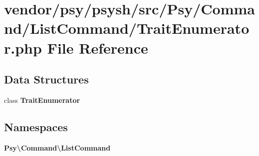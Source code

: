 \section{vendor/psy/psysh/src/\+Psy/\+Command/\+List\+Command/\+Trait\+Enumerator.php File Reference}
\label{_trait_enumerator_8php}
\subsection*{Data Structures}
\begin{DoxyCompactItemize}
\item 
class {\bf Trait\+Enumerator}
\end{DoxyCompactItemize}
\subsection*{Namespaces}
\begin{DoxyCompactItemize}
\item 
 {\bf Psy\textbackslash{}\+Command\textbackslash{}\+List\+Command}
\end{DoxyCompactItemize}
